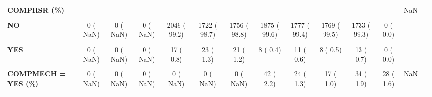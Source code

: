 \documentclass[
]{article}
\begin{document}
\begin{table}[H]
\begin{tabular}[t]{>{\raggedright\arraybackslash}p{5em}ccccccccccccc}
\textbf{COMPHSR (\%)} &  &  &  &  &  &  &  &  &  &  &  & NaN & \\
\textbf{\cellcolor{gray!10}{No}} & \cellcolor{gray!10}{0 (  NaN)} & \cellcolor{gray!10}{0 (  NaN)} & \cellcolor{gray!10}{0 (  NaN)} & \cellcolor{gray!10}{0 (  0.0)} & \cellcolor{gray!10}{0 (  0.0)} & \cellcolor{gray!10}{0 (  0.0)} & \cellcolor{gray!10}{0 (  0.0)} & \cellcolor{gray!10}{0 (  0.0)} & \cellcolor{gray!10}{0 (  0.0)} & \cellcolor{gray!10}{0 (  0.0)} & \cellcolor{gray!10}{1719 ( 99.6)} & \cellcolor{gray!10}{} & \cellcolor{gray!10}{}\\
\textbf{NO} & 0 (  NaN) & 0 (  NaN) & 0 (  NaN) & 2049 ( 99.2) & 1722 ( 98.7) & 1756 ( 98.8) & 1875 ( 99.6) & 1777 ( 99.4) & 1769 ( 99.5) & 1733 ( 99.3) & 0 (  0.0) &  & \\
\textbf{\cellcolor{gray!10}{Yes}} & \cellcolor{gray!10}{0 (  NaN)} & \cellcolor{gray!10}{0 (  NaN)} & \cellcolor{gray!10}{0 (  NaN)} & \cellcolor{gray!10}{0 (  0.0)} & \cellcolor{gray!10}{0 (  0.0)} & \cellcolor{gray!10}{0 (  0.0)} & \cellcolor{gray!10}{0 (  0.0)} & \cellcolor{gray!10}{0 (  0.0)} & \cellcolor{gray!10}{0 (  0.0)} & \cellcolor{gray!10}{0 (  0.0)} & \cellcolor{gray!10}{7 (  0.4)} & \cellcolor{gray!10}{} & \cellcolor{gray!10}{}\\
\textbf{YES} & 0 (  NaN) & 0 (  NaN) & 0 (  NaN) & 17 (  0.8) & 23 (  1.3) & 21 (  1.2) & 8 (  0.4) & 11 (  0.6) & 8 (  0.5) & 13 (  0.7) & 0 (  0.0) &  & \\
\textbf{\cellcolor{gray!10}{COMPINF = YES (\%)}} & \cellcolor{gray!10}{0 (  NaN)} & \cellcolor{gray!10}{0 (  NaN)} & \cellcolor{gray!10}{0 (  NaN)} & \cellcolor{gray!10}{0 (  NaN)} & \cellcolor{gray!10}{76 (  4.4)} & \cellcolor{gray!10}{122 (  6.9)} & \cellcolor{gray!10}{0 (  NaN)} & \cellcolor{gray!10}{0 (  NaN)} & \cellcolor{gray!10}{0 (  NaN)} & \cellcolor{gray!10}{0 (  NaN)} & \cellcolor{gray!10}{0 (  NaN)} & \cellcolor{gray!10}{NaN} & \cellcolor{gray!10}{}\\
\textbf{COMPMECH = YES (\%)} & 0 (  NaN) & 0 (  NaN) & 0 (  NaN) & 0 (  NaN) & 0 (  NaN) & 0 (  NaN) & 42 (  2.2) & 24 (  1.3) & 17 (  1.0) & 34 (  1.9) & 28 (  1.6) & NaN & \\
\textbf{\cellcolor{gray!10}{CP2Y12 = YES (\%)}} & \cellcolor{gray!10}{0 (  NaN)} & \cellcolor{gray!10}{0 (  NaN)} & \cellcolor{gray!10}{0 (  NaN)} & \cellcolor{gray!10}{0 (  NaN)} & \cellcolor{gray!10}{202 ( 11.6)} & \cellcolor{gray!10}{227 ( 12.8)} & \cellcolor{gray!10}{280 ( 14.9)} & \cellcolor{gray!10}{242 ( 13.5)} & \cellcolor{gray!10}{261 ( 14.7)} & \cellcolor{gray!10}{210 ( 12.0)} & \cellcolor{gray!10}{160 (  9.1)} & \cellcolor{gray!10}{NaN} & \cellcolor{gray!10}{}\\

\end{tabular}
\end{table}
\end{document}

